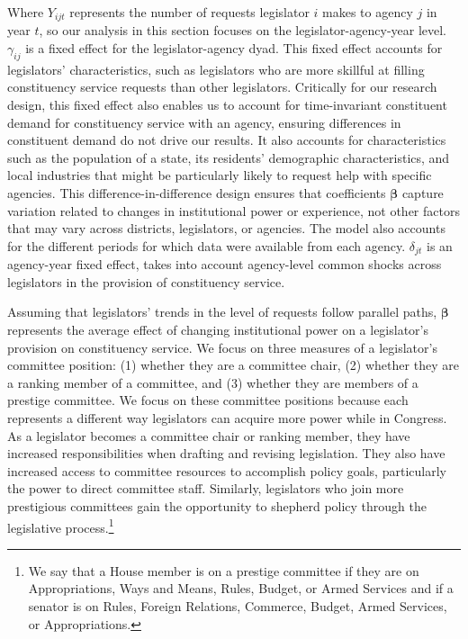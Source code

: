 \documentclass[12pt]{article}
\begin{document}
Where $Y_{ijt}$ represents the number of requests legislator $i$ makes to agency $j$ in year $t$, so our analysis in this section focuses on the legislator-agency-year level. $\gamma_{ij}$ is a fixed effect for the legislator-agency dyad. This fixed effect accounts for legislators' characteristics, such as legislators who are more skillful at filling constituency service requests than other legislators. Critically for our research design, this fixed effect also enables us to account for time-invariant constituent demand for constituency service with an agency, ensuring differences in constituent demand do not drive our results. It also accounts for characteristics such as the population of a state, its residents' demographic characteristics, and local industries that might be particularly likely to request help with specific agencies. This difference-in-difference design ensures that coefficients $\boldsymbol{\beta}$ capture variation related to changes in institutional power or experience, not other factors that may vary across districts, legislators, or agencies. The model also accounts for the different periods for which data were available from each agency. $\delta_{jt}$ is an agency-year fixed effect, takes into account agency-level common shocks across legislators in the provision of constituency service. 

Assuming that legislators' trends in the level of requests follow parallel paths, $\boldsymbol{\beta}$ represents the average effect of changing institutional power on a legislator's provision on constituency service. We focus on three measures of a legislator's committee position: (1) whether they are a committee chair, (2) whether they are a ranking member of a committee, and (3) whether they are members of a prestige committee. We focus on these committee positions because each represents a different way legislators can acquire more power while in Congress. As a legislator becomes a committee chair or ranking member, they have increased responsibilities when drafting and revising legislation. They also have increased access to committee resources to accomplish policy goals, particularly the power to direct committee staff. Similarly, legislators who join more prestigious committees gain the opportunity to shepherd policy through the legislative process.\footnote{We say that a House member is on a prestige committee if they are on Appropriations, Ways and Means, Rules, Budget, or Armed Services and if a senator is on Rules, Foreign Relations, Commerce, Budget, Armed Services, or Appropriations.} %
\end{document}

